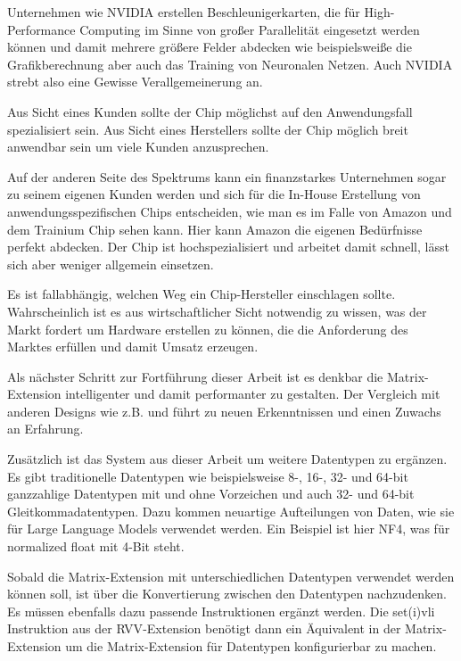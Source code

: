 Unternehmen wie NVIDIA erstellen Beschleunigerkarten, die für High-Performance Computing im Sinne von großer Parallelität eingesetzt werden können und damit mehrere größere Felder abdecken wie beispielsweiße die Grafikberechnung aber auch das Training von Neuronalen Netzen. Auch NVIDIA strebt also eine Gewisse Verallgemeinerung an.

Aus Sicht eines Kunden sollte der Chip möglichst auf den Anwendungsfall spezialisiert sein. Aus Sicht eines Herstellers sollte der Chip möglich breit anwendbar sein um viele Kunden anzusprechen.

Auf der anderen Seite des Spektrums kann ein finanzstarkes Unternehmen sogar zu seinem eigenen Kunden werden und sich für die In-House Erstellung von anwendungsspezifischen Chips entscheiden, wie man es im Falle von Amazon und dem Trainium Chip sehen kann. Hier kann Amazon die eigenen Bedürfnisse perfekt abdecken. Der Chip ist hochspezialisiert und arbeitet damit schnell, lässt sich aber weniger allgemein einsetzen.

Es ist fallabhängig, welchen Weg ein Chip-Hersteller einschlagen sollte. Wahrscheinlich ist es aus wirtschaftlicher Sicht notwendig zu wissen, was der Markt fordert um Hardware erstellen zu können, die die Anforderung des Marktes erfüllen und damit Umsatz erzeugen.


Als nächster Schritt zur Fortführung dieser Arbeit ist es denkbar die Matrix-Extension intelligenter und damit performanter zu gestalten. Der Vergleich mit anderen Designs wie z.B. \cite{DBLP:journals/corr/abs-2104-03142} und \cite{scoss} führt zu neuen Erkenntnissen und einen Zuwachs an Erfahrung.

Zusätzlich ist das System aus dieser Arbeit um weitere Datentypen zu ergänzen. Es gibt traditionelle Datentypen wie beispielsweise 8-, 16-, 32- und 64-bit ganzzahlige Datentypen mit und ohne Vorzeichen und auch 32- und 64-bit Gleitkommadatentypen. Dazu kommen neuartige Aufteilungen von Daten, wie sie für Large Language Models verwendet werden. Ein Beispiel ist hier NF4, was für normalized float mit 4-Bit steht.

Sobald die Matrix-Extension mit unterschiedlichen Datentypen verwendet werden können soll, ist über die Konvertierung zwischen den Datentypen nachzudenken. Es müssen ebenfalls dazu passende Instruktionen ergänzt werden. Die set(i)vli Instruktion aus der \gls{RVV}-Extension benötigt dann ein Äquivalent in der Matrix-Extension um die Matrix-Extension für Datentypen konfigurierbar zu machen.

